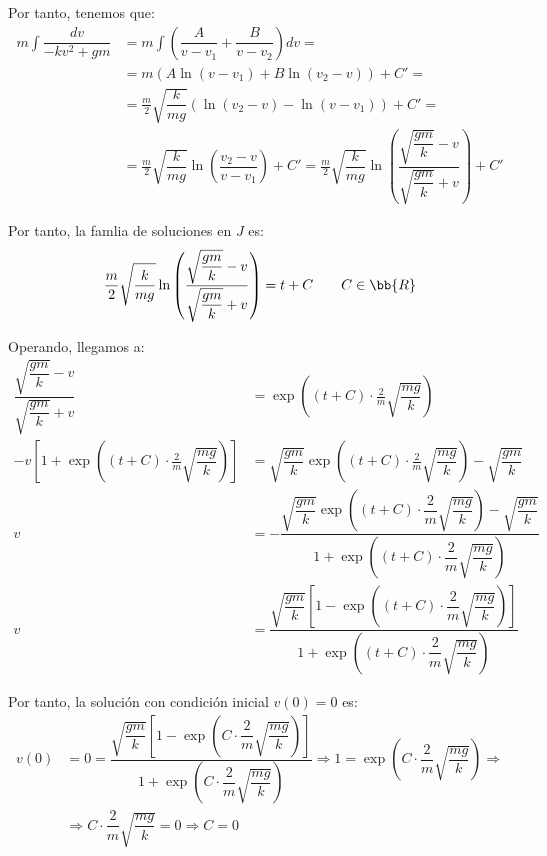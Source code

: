 \begin{ejercicio}
    Por tanto, tenemos que:
    \begin{align*}
        m\int \dfrac{dv}{-kv^2 + gm} &= m\int \left(\dfrac{A}{v-v_1} + \dfrac{B}{v-v_2}\right)dv
        =\\&=m\left(A\ln(v-v_1) + B\ln(v_2-v)\right) + C'
        =\\&= \frac{m}{2}\sqrt{\dfrac{k}{mg}}\left(\ln(v_2-v) - \ln(v-v_1)\right) + C'
        =\\&= \frac{m}{2}\sqrt{\dfrac{k}{mg}}\ln\left(\dfrac{v_2-v}{v-v_1}\right) + C'
        = \frac{m}{2}\sqrt{\dfrac{k}{mg}}\ln\left(\dfrac{\sqrt{\dfrac{gm}{k}}-v}{\sqrt{\dfrac{gm}{k}}+v}\right) + C'
    \end{align*}

    Por tanto, la famlia de soluciones en $J$ es:
    \begin{equation*}
        \dfrac{m}{2}\sqrt{\dfrac{k}{mg}}\ln\left(\dfrac{\sqrt{\dfrac{gm}{k}}-v}{\sqrt{\dfrac{gm}{k}}+v}\right) = t + C \qquad C\in \bb{R}
    \end{equation*}

    Operando, llegamos a:
    \begin{align*}
        \dfrac{\sqrt{\dfrac{gm}{k}}-v}{\sqrt{\dfrac{gm}{k}}+v} &= \exp\left((t+C)\cdot \frac{2}{m}\sqrt{\dfrac{mg}{k}}\right)\\
        -v\left[1+\exp\left((t+C)\cdot \frac{2}{m}\sqrt{\dfrac{mg}{k}}\right)\right] &= \sqrt{\dfrac{gm}{k}}\exp\left((t+C)\cdot \frac{2}{m}\sqrt{\dfrac{mg}{k}}\right) - \sqrt{\dfrac{gm}{k}}\\
        v&=-\dfrac{\sqrt{\dfrac{gm}{k}}\exp\left((t+C)\cdot \dfrac{2}{m}\sqrt{\dfrac{mg}{k}}\right) - \sqrt{\dfrac{gm}{k}}}{1+\exp\left((t+C)\cdot \dfrac{2}{m}\sqrt{\dfrac{mg}{k}}\right)} \\
        v&=\dfrac{\sqrt{\dfrac{gm}{k}}\left[1-\exp\left((t+C)\cdot \dfrac{2}{m}\sqrt{\dfrac{mg}{k}}\right)\right]}{1+\exp\left((t+C)\cdot \dfrac{2}{m}\sqrt{\dfrac{mg}{k}}\right)}
    \end{align*}

    Por tanto, la solución con condición inicial $v(0)=0$ es:
    \begin{align*}
        v(0)&=0=\dfrac{\sqrt{\dfrac{gm}{k}}\left[1-\exp\left(C\cdot \dfrac{2}{m}\sqrt{\dfrac{mg}{k}}\right)\right]}{1+\exp\left(C\cdot \dfrac{2}{m}\sqrt{\dfrac{mg}{k}}\right)} \Longrightarrow 1 = \exp\left(C\cdot \dfrac{2}{m}\sqrt{\dfrac{mg}{k}}\right)
        \Longrightarrow \\&\Longrightarrow C\cdot \dfrac{2}{m}\sqrt{\dfrac{mg}{k}} = 0 \Longrightarrow C=0
    \end{align*}


\end{ejercicio}
